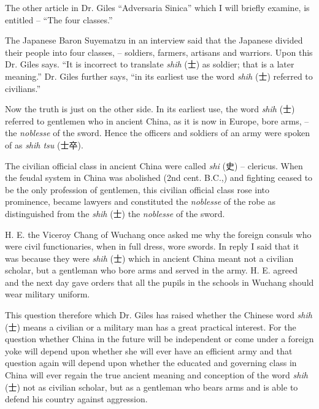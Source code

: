 The other article in Dr. Giles ``Adversaria Sinica'' which I will briefly examine, is entitled -- ``The four classes.''

The Japanese Baron Suyematzu in an interview said
that the Japanese divided their people into four classes,
-- soldiers, farmers, artisans and warriors.
Upon this Dr. Giles says.
``It is incorrect to translate \emph{shih} (士) as soldier; that is a later meaning.''
Dr. Giles further says, ``in its earliest use the word \emph{shih} (士) referred to civilians.''

Now the truth is just on the other side.
In its earliest use, the word \emph{shih} (士) referred to gentlemen
who in ancient China, as it is now in Europe, bore arms,
-- the \emph{noblesse} of the sword. Hence the officers and soldiers of an army were spoken of as \emph{shih tsu} (士卒).

The civilian official class in ancient China were called \emph{shi} (史)
-- clericus.
When the feudal system in China was abolished (2nd cent. B.C.,) and fighting ceased to be the only profession of gentlemen,
this civilian official class rose into prominence,
became lawyers and constituted the \emph{noblesse} of the robe as distinguished from the \emph{shih} (士) the \emph{noblesse} of the sword.

H. E. the Viceroy Chang of Wuchang once asked me why the
foreign consuls who were civil functionaries, when in full dress, wore swords.
In reply I said that it was because they were \emph{shih} (士)
which in ancient China meant not a civilian scholar,
but a gentleman who bore arms and served in the army.
H. E. agreed and the next day gave orders that all the pupils in the schools in Wuchang should wear military uniform.

This question therefore which Dr. Giles has raised whether the Chinese word \emph{shih} (士) means a civilian or a military man has a great practical interest.
For the question whether China in the future will be independent or come under a foreign yoke will depend upon whether she will ever have an efficient army and that question again will depend upon whether the educated and governing class in China will ever regain the true ancient meaning and conception of the word \emph{shih} (士) not as civilian scholar, but as a gentleman who bears arms and is able to defend his country against aggression.
